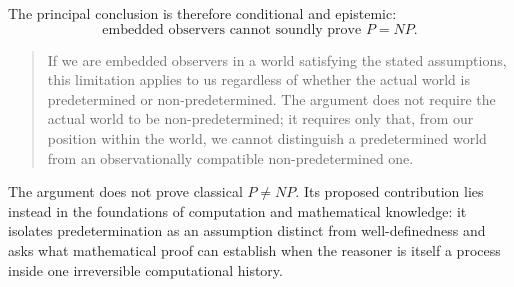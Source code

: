 \documentclass[11pt]{article}
\begin{document}
 

The principal conclusion is therefore conditional and epistemic:
\[
  \boxed{\text{embedded observers cannot soundly prove \(P=NP\).}}
\]

\begin{quote}
    If we are embedded observers in a world satisfying the stated assumptions, this limitation applies to us regardless of whether the actual world is predetermined or non-predetermined. The argument does not require the actual world to be non-predetermined; it requires only that, from our position within the world, we cannot distinguish a predetermined world from an observationally compatible non-predetermined one.

\end{quote}

The argument does not prove classical \(P\neq NP\).  Its proposed contribution lies instead
in the foundations of computation and mathematical knowledge: it isolates predetermination as
an assumption distinct from well-definedness and asks what mathematical proof can establish
when the reasoner is itself a process inside one irreversible computational history.

 
\end{document}
